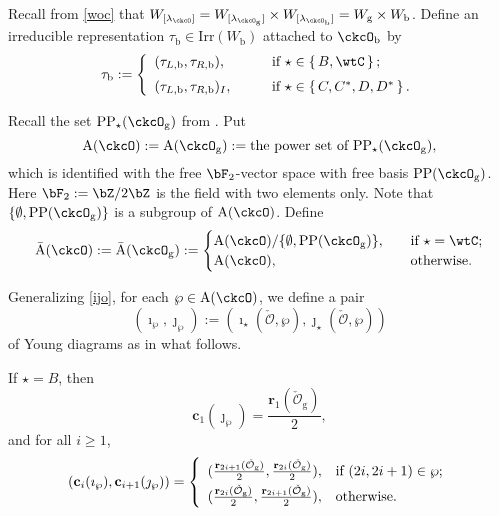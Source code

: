 \documentclass[12pt,a4paper]{amsart}
\newcommand{\CO}{{\mathcal {O}}}
\numberwithin{equation}{section}
\theoremstyle{remark}
\def\Irr{\mathrm{Irr}}
\def\lamck{\lambda_\ckcO}
\def\lamckb{\lambda_{\ckcO_{\mathrm b}}}
\def\lamckg{\lambda_{\ckcO_{\mathrm g}}}
\def\Wb{W_{\mathrm b}}
\def\Wg{W_{\mathrm g}}
\def\CPP{\mathrm{PP}}
\def\CPPs{\mathrm{PP}_{\star}}
\begin{document}
 Recall  from \eqref{woc} that  $
    W_{[\lamck]} =W_{[\lamckg]}\times W_{[\lamckb]}=\Wg\times \Wb$.
 Define an irreducible  representation $\tau_{\mathrm b}\in \Irr(W_{\mathrm b})$ attached to $\ckcO_{\mathrm b}$ by
\begin{equation}\label{eq:taub}
 \tau_{\mathrm b}:= \left\{
     \begin{array}{ll}
       ( \tau_{L,\mathrm b}, \tau_{R,\mathrm b}), \qquad
       & \text{if } \star \in \set{B,\wtC}; \medskip\\
         ( \tau_{L,\mathrm b}, \tau_{R,\mathrm b})_I, \qquad & \text{if } \star \in \set{C,C^{*}, D,D^{*}}.
\end{array}
  \right.
\end{equation}



Recall the set  $\CPPs(\ckcO_{\mathrm g})$ from   .   Put
  \[
    {\mathrm A}(\ckcO) := {\mathrm A}(\ckcO_{\mathrm g}):= \textrm{the power set of $\CPPs(\ckcO_{\mathrm g})$},
    \]
    which is identified with the free $\bF_2$-vector space with free basis $\CPP(\ckcO_{\mathrm g})$. Here $\bF_{2}:=\bZ/2\bZ$ is the field with two elements only.
Note that   $\{\emptyset, \CPP(\ckcO_{\mathrm g})\}$ is a subgroup of ${\mathrm A}(\ckcO)$.  Define
   \begin{equation*}%
  \bar{\mathrm A}(\ckcO):= \bar{\mathrm A}(\ckcO_{\mathrm g}):=
  \begin{cases}
 {\mathrm A}(\ckcO)/\{\emptyset, \CPP(\ckcO_{\mathrm g})\}, & \quad \text{if  } \star =\wtC;\\
 {\mathrm A}(\ckcO),  & \quad \text{otherwise.}
  \end{cases}
  \end{equation*}

  Generalizing \eqref{ijo}, for each $\wp\in  {\mathrm A}(\ckcO)$,    we define a pair \[
(\imath_\wp, \jmath_\wp):=(\imath_\star(\check \CO, \wp), \jmath_\star(\check \CO, \wp))
\]
 of Young diagrams  as in what follows.

If $\star=B$, then
 \[
   \mathbf c_{1}(\jmath_\wp)=\frac{\mathbf r_1(\check \CO_{\mathrm g})}{2},
\]
and for all $i\geq 1$,
\[
(\mathbf c_{i}(\imath_\wp), \mathbf c_{i+1}(\jmath_\wp))=
   \left\{
     \begin{array}{ll}
           (\frac{\mathbf r_{2i+1}(\check \CO_{\mathrm g})}{2},  \frac{\mathbf r_{2i}(\check \CO_{\mathrm g})}{2}), &\hbox{if $(2i, 2i+1)\in \wp$}; \smallskip\\
            (\frac{\mathbf r_{2i}(\check \CO_{\mathrm g})}{2},  \frac{\mathbf r_{2i+1}(\check \CO_{\mathrm g})}{2}), &\hbox{otherwise}.\\
            \end{array}
   \right.
\]
\end{document}
